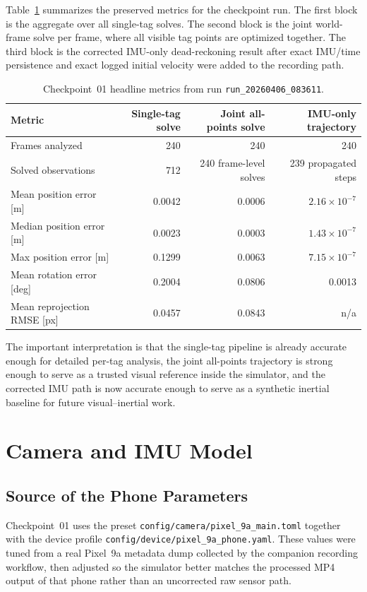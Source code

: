 \documentclass[11pt,a4paper]{article}
\newcommand{\runid}{\texttt{run\_20260406\_083611}}
\begin{document}
Table~\ref{tab:headline-metrics} summarizes the preserved metrics for the checkpoint run.
The first block is the aggregate over all single-tag solves.
The second block is the joint world-frame solve per frame, where all visible tag points are optimized together.
The third block is the corrected IMU-only dead-reckoning result after exact IMU/time persistence and exact logged initial velocity were added to the recording path.

\begin{table}[H]
\centering
\caption{Checkpoint~01 headline metrics from run \runid.}
\label{tab:headline-metrics}
\begin{tabular}{lrrr}
\toprule
Metric & Single-tag solve & Joint all-points solve & IMU-only trajectory \\
\midrule
Frames analyzed & 240 & 240 & 240 \\
Solved observations & 712 & 240 frame-level solves & 239 propagated steps \\
Mean position error [m] & 0.0042 & 0.0006 & $2.16\times10^{-7}$ \\
Median position error [m] & 0.0023 & 0.0003 & $1.43\times10^{-7}$ \\
Max position error [m] & 0.1299 & 0.0063 & $7.15\times10^{-7}$ \\
Mean rotation error [deg] & 0.2004 & 0.0806 & 0.0013 \\
Mean reprojection RMSE [px] & 0.0457 & 0.0843 & n/a \\
\bottomrule
\end{tabular}
\end{table}

The important interpretation is that the single-tag pipeline is already accurate enough for detailed per-tag analysis, the joint all-points trajectory is strong enough to serve as a trusted visual reference inside the simulator, and the corrected IMU path is now accurate enough to serve as a synthetic inertial baseline for future visual--inertial work.

\section{Camera and IMU Model}

\subsection{Source of the Phone Parameters}

Checkpoint~01 uses the preset \texttt{config/camera/pixel\_9a\_main.toml} together with the device profile \texttt{config/device/pixel\_9a\_phone.yaml}.
These values were tuned from a real Pixel~9a metadata dump collected by the companion recording workflow, then adjusted so the simulator better matches the processed MP4 output of that phone rather than an uncorrected raw sensor path.
\end{document}
